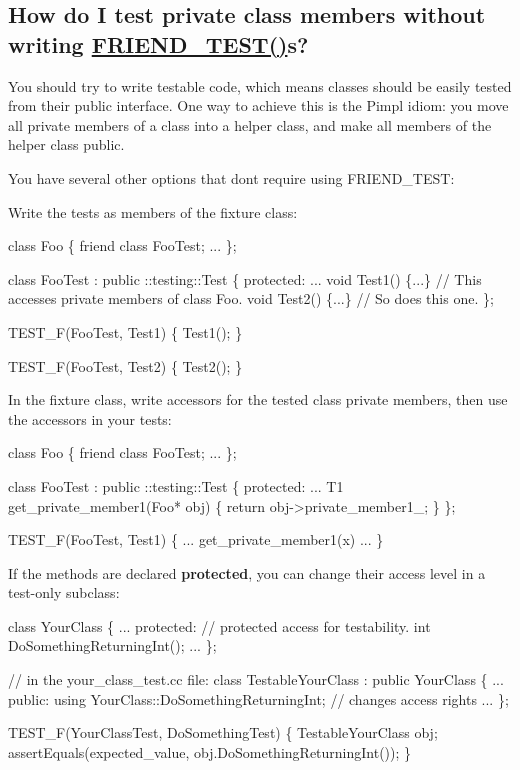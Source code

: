\subsection*{How do I test private class members without writing \hyperlink{gtest__prod_8h_a8d443b4cc1d87a7a17943b8fbdbf3910}{F\+R\+I\+E\+N\+D\+\_\+\+T\+E\+S\+T()}s?}

You should try to write testable code, which means classes should be easily tested from their public interface. One way to achieve this is the Pimpl idiom\+: you move all private members of a class into a helper class, and make all members of the helper class public.

You have several other options that don\textquotesingle{}t require using {\ttfamily F\+R\+I\+E\+N\+D\+\_\+\+T\+E\+ST}\+:
\begin{DoxyItemize}
\item Write the tests as members of the fixture class\+: 
\begin{DoxyCode}
class Foo \{
  friend class FooTest;
  ...
\};

class FooTest : public ::testing::Test \{
 protected:
  ...
  void Test1() \{...\} // This accesses private members of class Foo.
  void Test2() \{...\} // So does this one.
\};

TEST\_F(FooTest, Test1) \{
  Test1();
\}

TEST\_F(FooTest, Test2) \{
  Test2();
\}
\end{DoxyCode}

\item In the fixture class, write accessors for the tested class\textquotesingle{} private members, then use the accessors in your tests\+: 
\begin{DoxyCode}
class Foo \{
  friend class FooTest;
  ...
\};

class FooTest : public ::testing::Test \{
 protected:
  ...
  T1 get\_private\_member1(Foo* obj) \{
    return obj->private\_member1\_;
  \}
\};

TEST\_F(FooTest, Test1) \{
  ...
  get\_private\_member1(x)
  ...
\}
\end{DoxyCode}

\item If the methods are declared {\bfseries protected}, you can change their access level in a test-\/only subclass\+: 
\begin{DoxyCode}
class YourClass \{
  ...
 protected: // protected access for testability.
  int DoSomethingReturningInt();
  ...
\};

// in the your\_class\_test.cc file:
class TestableYourClass : public YourClass \{
  ...
 public: using YourClass::DoSomethingReturningInt; // changes access rights
  ...
\};

TEST\_F(YourClassTest, DoSomethingTest) \{
  TestableYourClass obj;
  assertEquals(expected\_value, obj.DoSomethingReturningInt());
\}
\end{DoxyCode}

\end{DoxyItemize}


